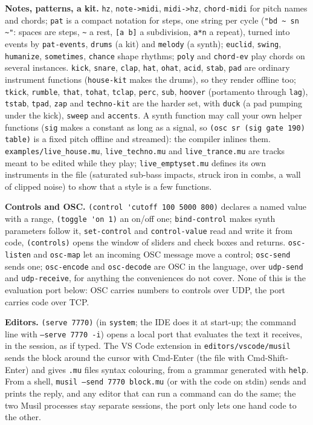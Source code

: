 \documentclass[11pt,a4paper]{article}
\newcommand{\musil}[1]{\lstinline[style=musilinline]{#1}}
\begin{document}
\textbf{Notes, patterns, a kit.} \musil{hz}, \musil{note->midi}, \musil{midi->hz},
\musil{chord-midi} for pitch names and chords; \musil{pat} is a compact notation for steps,
one string per cycle (\musil{"bd ~ sn ~"}: spaces are steps, \texttt{\textasciitilde} a rest,
\texttt{[a b]} a subdivision, \texttt{a*n} a repeat), turned into events by
\musil{pat-events}, \musil{drums} (a kit) and \musil{melody} (a synth); \musil{euclid},
\musil{swing}, \musil{humanize}, \musil{sometimes}, \musil{chance} shape rhythms;
\musil{poly} and \musil{chord-ev} play chords on several instances. \musil{kick},
\musil{snare}, \musil{clap}, \musil{hat}, \musil{ohat}, \musil{acid}, \musil{stab},
\musil{pad} are ordinary instrument functions (\musil{house-kit} makes the drums), so
they render offline too; \musil{tkick}, \musil{rumble}, \musil{that}, \musil{tohat},
\musil{tclap}, \musil{perc}, \musil{sub}, \musil{hoover} (portamento through \musil{lag}),
\musil{tstab}, \musil{tpad}, \musil{zap} and \musil{techno-kit} are the harder set, with
\musil{duck} (a pad pumping under the kick), \musil{sweep} and \musil{accents}. A synth
function may call your own helper functions (\musil{sig} makes a constant as long as a
signal, so \musil{(osc sr (sig gate 190) table)} is a fixed pitch offline and streamed):
the compiler inlines them. \texttt{examples/live\_house.mu}, \texttt{live\_techno.mu} and \texttt{live\_trance.mu} are
tracks meant to be edited while they play; \texttt{live\_emptyset.mu} defines its own instruments in the file
(saturated sub-bass impacts, struck iron in combs, a wall of clipped noise) to show that a style is a few functions.

\textbf{Controls and OSC.} \musil{(control 'cutoff 100 5000 800)} declares a named value
with a range, \musil{(toggle 'on 1)} an on/off one; \musil{bind-control} makes synth
parameters follow it, \musil{set-control} and \musil{control-value} read and write it from
code, \musil{(controls)} opens the window of sliders and check boxes and returns. \musil{osc-listen} and
\musil{osc-map} let an incoming OSC message move a control; \musil{osc-send} sends one;
\musil{osc-encode} and \musil{osc-decode} are OSC in the language, over \musil{udp-send}
and \musil{udp-receive}, for anything the conveniences do not cover. None of this is the
evaluation port below: OSC carries numbers to controls over UDP, the port carries code
over TCP.

\textbf{Editors.} \musil{(serve 7770)} (in \texttt{system}; the IDE does it at start-up; the command line
with \texttt{--serve 7770 -i}) opens a local port that evaluates the text it receives, in
the session, as if typed. The VS Code extension in \texttt{editors/vscode/musil} sends the
block around the cursor with Cmd-Enter (the file with Cmd-Shift-Enter) and gives
\texttt{.mu} files syntax colouring, from a grammar generated with \texttt{help}. From a
shell, \texttt{musil --send 7770 block.mu} (or with the code on stdin) sends and prints the
reply, and any editor that can run a command can do the same; the two Musil processes
stay separate sessions, the port only lets one hand code to the other.
\end{document}
